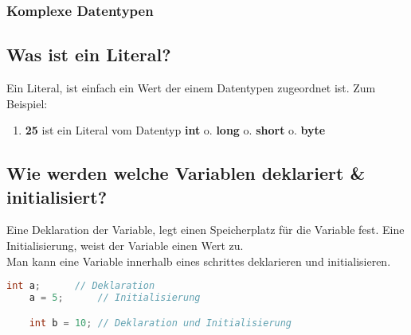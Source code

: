 \documentclass[12pt, a4paper]{article}
\begin{document}
\subsubsection*{Komplexe Datentypen}
\begin{table}[h!]
\end{table}
\newpage
\subsection*{Was ist ein Literal?}
Ein Literal, ist einfach ein Wert der einem Datentypen zugeordnet ist. Zum Beispiel:
\begin{enumerate}[label=]
    \item \textbf{25} ist ein Literal vom Datentyp \textbf{int} o. \textbf{long} o. \textbf{short} o. \textbf{byte}
\end{enumerate}
\subsection*{Wie werden welche Variablen deklariert \& initialisiert?}
Eine Deklaration der Variable, legt einen Speicherplatz für die Variable fest. Eine Initialisierung, weist der Variable einen Wert zu. \\
Man kann eine Variable innerhalb eines schrittes deklarieren und initialisieren.
\begin{lstlisting}[language=java,title=Beispiele]
    int a;      // Deklaration
    a = 5;      // Initialisierung

    int b = 10; // Deklaration und Initialisierung    
\end{lstlisting}
\end{document}

